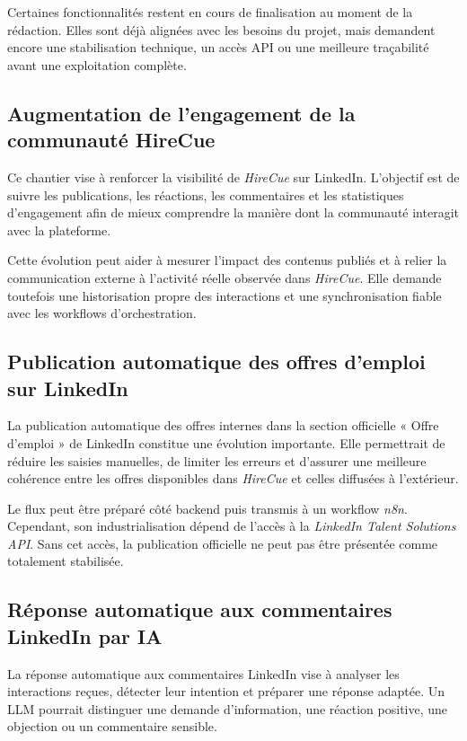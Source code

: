 Certaines fonctionnalités restent en cours de finalisation au moment de la rédaction. Elles sont déjà alignées avec les besoins du projet, mais demandent encore une stabilisation technique, un accès API ou une meilleure traçabilité avant une exploitation complète.

\subsection{Augmentation de l'engagement de la communauté HireCue}

Ce chantier vise à renforcer la visibilité de \textit{HireCue} sur LinkedIn. L'objectif est de suivre les publications, les réactions, les commentaires et les statistiques d'engagement afin de mieux comprendre la manière dont la communauté interagit avec la plateforme.

Cette évolution peut aider à mesurer l'impact des contenus publiés et à relier la communication externe à l'activité réelle observée dans \textit{HireCue}. Elle demande toutefois une historisation propre des interactions et une synchronisation fiable avec les workflows d'orchestration.

\subsection{Publication automatique des offres d'emploi sur LinkedIn}

La publication automatique des offres internes dans la section officielle « Offre d'emploi » de LinkedIn constitue une évolution importante. Elle permettrait de réduire les saisies manuelles, de limiter les erreurs et d'assurer une meilleure cohérence entre les offres disponibles dans \textit{HireCue} et celles diffusées à l'extérieur.

Le flux peut être préparé côté backend puis transmis à un workflow \textit{n8n}. Cependant, son industrialisation dépend de l'accès à la \textit{LinkedIn Talent Solutions API}. Sans cet accès, la publication officielle ne peut pas être présentée comme totalement stabilisée.

\subsection{Réponse automatique aux commentaires LinkedIn par IA}

La réponse automatique aux commentaires LinkedIn vise à analyser les interactions reçues, détecter leur intention et préparer une réponse adaptée. Un LLM pourrait distinguer une demande d'information, une réaction positive, une objection ou un commentaire sensible.

